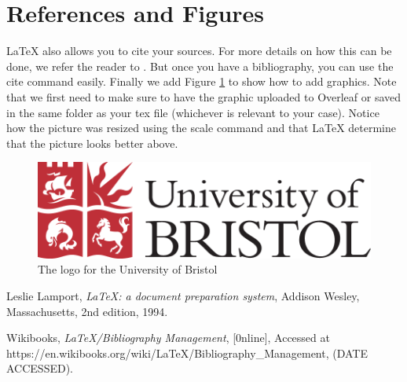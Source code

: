 \documentclass[a4paper,11pt]{article}
\theoremstyle{definition}
\begin{document}
\section{References and Figures}
\LaTeX{} \cite{lamport94} also allows you to cite your sources. For more details on how this can be done, we refer the reader to \cite[sec:~Embedded System]{referencing}. But once you have a bibliography, you can use the cite command easily. Finally we add Figure \ref{fig:logo} to show how to add graphics. Note that we first need to make sure to have the graphic uploaded to Overleaf or saved in the same folder as your tex file (whichever is relevant to your case). Notice how the picture was resized using the scale command and that \LaTeX{} determine that the picture looks better above.

\begin{figure}
    \centering
    \includegraphics[scale=0.3]{logo-full-colour.png}
    \caption{The logo for the University of Bristol}
    \label{fig:logo}
\end{figure}


\begin{thebibliography}{99}

  Leslie Lamport,
  \textit{\LaTeX: a document preparation system},
  Addison Wesley, Massachusetts,
  2nd edition,
  1994.
  
    Wikibooks,
    \textit{LaTeX/Bibliography Management},
    [0nline],
    Accessed at https://en.wikibooks.org/wiki/LaTeX/Bibliography\_Management,
    (DATE ACCESSED).
    

\end{thebibliography}
\end{document}
